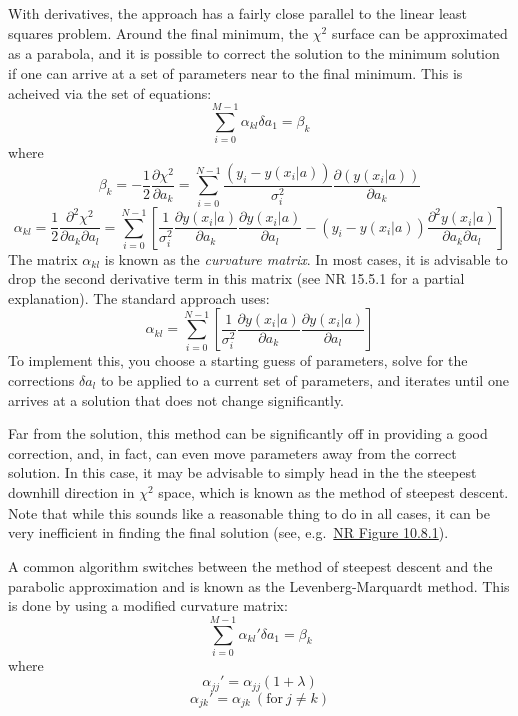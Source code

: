 \documentclass{article}
\begin{document}
With derivatives, the approach has a fairly close parallel to the linear
least squares problem. Around the final minimum, the $ \chi^{2}_{}$ surface
can be approximated as a parabola, and it is possible to correct the
solution to the minimum solution if one can arrive at a set of parameters
near to the final minimum. This is acheived via the set of equations:
$$
    \sum_{i=0}^{M-1}\alpha_{kl}\delta a_{1} = \beta_{k}
$$
where
$$
    \beta_{k} = -\frac{1}{2}\frac{\partial\chi^{2}}{\partial a_{k}} =
    \sum_{i=0}^{N-1}\frac{(y_{i}-y(x_{i}|a))}{\sigma_{i}^{2}}
    \frac{\partial(y(x_{i}|a))}{\partial a_{k}}
$$
$$
    \alpha_{kl} =
    \frac{1}{2}\frac{\partial^2\chi^2}{\partial a_k\partial a_l} =
    \sum_{i=0}^{N-1}\left[
        \frac{1}{\sigma_i^2}\frac{\partial y(x_i|a)}{\partial a_k}
        \frac{\partial y(x_i|a)}{\partial a_l} -
        (y_i-y(x_i|a))
        \frac{\partial^2y(x_i|a)}{\partial{a_k}\partial{a_l}}
    \right]
$$
The matrix $\alpha_{kl}$ is known as the \emph{curvature matrix}. In most
cases, it is advisable to drop the second derivative term in this matrix
(see NR 15.5.1 for a partial explanation). The standard approach uses:
$$
    \alpha_{kl} = \sum_{i=0}^{N-1}\left[\frac{1}{\sigma_i^2}
    \frac{\partial{y}(x_i|a)}{\partial{a_k}}
    \frac{\partial{y}(x_i|a)}{\partial{a_l}} \right]
$$
To implement this, you choose a starting guess of parameters, solve
for the corrections  $\delta a_l$ to be applied to a current set of
parameters, and iterates until one arrives at a solution that does not
change significantly.

Far from the solution, this method can be significantly off in
providing a good correction, and, in fact, can even move parameters
away from the correct solution. In this case, it may be advisable to
simply head in the the steepest downhill direction in $ \chi^{2}_{}$
space, which is known as the method of steepest descent. Note that
while this sounds like a reasonable thing to do in all cases, it can
be very inefficient in finding the final solution
(see, e.g.\ \href{http://astronomy.nmsu.edu/holtz/a575/images/NR10.8.1.png}
{NR Figure 10.8.1}).

A common algorithm switches between the method of steepest descent and
the parabolic approximation and is known as the Levenberg-Marquardt
method. This is done by using a modified curvature matrix:
$$ \sum_{i=0}^{M-1} \alpha_{kl}'\delta{a_1} = \beta_{k} $$
where
$$ \alpha_{jj}' = \alpha_{jj}(1+\lambda) $$
$$ \alpha_{jk}' = \alpha_{jk}\ (\textrm{for}\ j \neq k) $$
\end{document}
